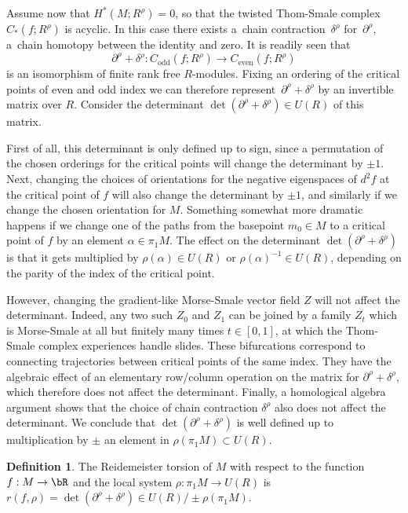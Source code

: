 \documentclass[JEP,XML,SOM,Unicode,NoFloatCountersInSection]{cedram}
\theoremstyle{plain}
\theoremstyle{definition}
\newtheorem{definition}[theorem]{Definition}
\begin{document}
Assume now that $H^*(M ; R^\rho)=0$, so that the twisted Thom-Smale complex $C_*(f ; R^\rho)$ is acyclic. In this case there exists a~chain contraction~$\delta^\rho$ for~$\partial^\rho$, \ie a~chain homotopy between the identity and zero. It is readily seen that
\[
\partial^\rho+\delta^\rho : C_{\text{odd}} (f ;R^\rho) \to C_{\text{even}}(f ; R^\rho)
\]
is an isomorphism of finite rank free $R$\nobreakdash-modules. Fixing an ordering of the critical points of even and odd index we can therefore represent~$\partial^\rho+\delta^\rho$ by an invertible matrix over $R$. Consider the determinant $\det(\partial^\rho+\delta^\rho) \in U(R)$ of this matrix.

First of all, this determinant is only defined up to sign, since a permutation of the chosen orderings for the critical points will change the determinant by $\pm1 $. Next, changing the choices of orientations for the negative eigenspaces of $d^2f$ at the critical point of $f$ will also change the determinant by $\pm 1$, and similarly if we change the chosen orientation for $M$. Something somewhat more dramatic happens if we change one of the paths from the basepoint $m_0\in M$ to a critical point of $f$ by an element $\alpha \in \pi_1M$. The effect on the determinant $\det(\partial^\rho + \delta^\rho)$ is that it gets multiplied by $\rho(\alpha) \in U(R)$ or $\rho(\alpha)^{-1} \in U(R)$, depending on the parity of the index of the critical point.

However, changing the gradient-like Morse-Smale vector field $Z$ will not affect the determinant. Indeed, any two such $Z_0$ and $Z_1$ can be joined by a family $Z_t$ which is Morse-Smale at all but finitely many times $t \in [0,1]$, at which the Thom-Smale complex experiences handle slides. These bifurcations correspond to connecting trajectories between critical points of the same index. They have the algebraic effect of an elementary row/column operation on the matrix for $\partial^\rho+\delta^\rho$, which therefore does not affect the determinant. Finally, a homological algebra argument shows that the choice of chain contraction $\delta^\rho$ also does not affect the determinant. We conclude that $\det(\partial^\rho+\delta^\rho)$ is well defined up to multiplication by $\pm$ an element in $\rho(\pi_1M) \subset U(R)$.

\begin{definition}\label{reidemeisterdef}
The Reidemeister torsion of $M$ with respect to the function $f:M \to \bR$ and the local system $\rho: \pi_1M \to U(R)$ is $r(f, \rho) = \det(\partial^\rho+\delta^\rho) \in U(R) / \pm \rho( \pi_1M )$.
\end{definition}
\end{document}
